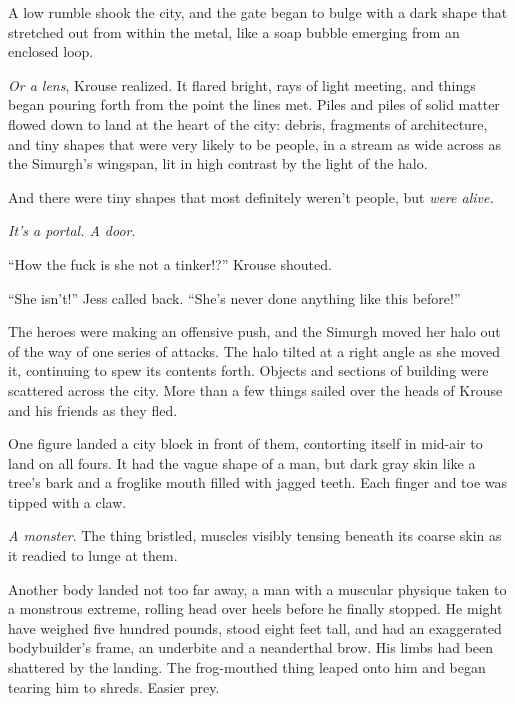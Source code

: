 A low rumble shook the city, and the gate began to bulge with a dark shape that stretched out from within the metal, like a soap bubble emerging from an enclosed loop.



\emph{Or a lens}, Krouse realized.  It flared bright, rays of light meeting, and things began pouring forth from the point the lines met.   Piles and piles of solid matter flowed down to land at the heart of the city: debris, fragments of architecture, and tiny shapes that were very likely to be people, in a stream as wide across as the Simurgh's wingspan, lit in high contrast by the light of the halo.



And there were tiny shapes that most definitely weren't people, but \emph{were alive.}



\emph{It's a portal.  A door}.



``How the fuck is she not a tinker!?'' Krouse shouted.



``She isn't!'' Jess called back.  ``She's never done anything like this before!''



The heroes were making an offensive push, and the Simurgh moved her halo out of the way of one series of attacks.  The halo tilted at a right angle as she moved it, continuing to spew its contents forth.   Objects and sections of building were scattered across the city.  More than a few things sailed over the heads of Krouse and his friends as they fled.



One figure landed a city block in front of them, contorting itself in mid-air to land on all fours.  It had the vague shape of a man, but dark gray skin like a tree's bark and a froglike mouth filled with jagged teeth.  Each finger and toe was tipped with a claw.



\emph{A monster}.  The thing bristled, muscles visibly tensing beneath its coarse skin as it readied to lunge at them.



Another body landed not too far away, a man with a muscular physique taken to a monstrous extreme, rolling head over heels before he finally stopped.  He might have weighed five hundred pounds, stood eight feet tall, and had an exaggerated bodybuilder's frame, an underbite and a neanderthal brow.  His limbs had been shattered by the landing.  The frog-mouthed thing leaped onto him and began tearing him to shreds.  Easier prey.



